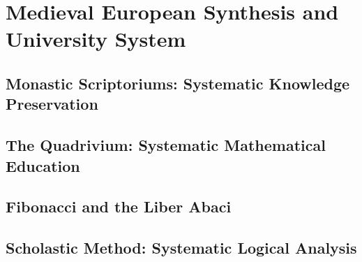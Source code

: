

\chapter{Medieval European Synthesis and University System}

\section{Monastic Scriptoriums: Systematic Knowledge Preservation}

\section{The Quadrivium: Systematic Mathematical Education}

\section{Fibonacci and the Liber Abaci}

\section{Scholastic Method: Systematic Logical Analysis}
